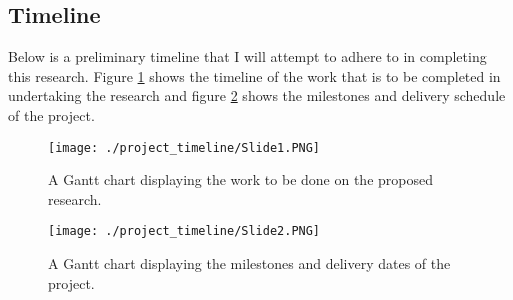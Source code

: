 \documentclass[11pt]{article}
\begin{document}
\subsection{Timeline}
Below is a preliminary timeline that I will attempt to adhere to in completing
this research. Figure \ref{fig:main_gantt} shows the timeline of the work that
is to be completed in undertaking the research and figure
\ref{fig:delivery_gantt} shows the milestones and delivery schedule of the
project.
\begin{figure}[!htb]
	\texttt{[image: ./project\_timeline/Slide1.PNG]}
	\caption{A Gantt chart displaying the work to be done on the proposed research.}
	\label{fig:main_gantt}
\end{figure}
\begin{figure}[!htb]
	\texttt{[image: ./project\_timeline/Slide2.PNG]}
	\caption{A Gantt chart displaying the milestones and delivery dates of the project.}
	\label{fig:delivery_gantt}
\end{figure}


\end{document}
